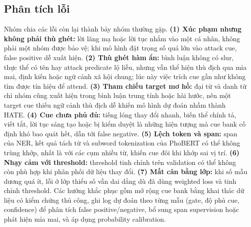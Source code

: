 \documentclass[11pt]{article}
\begin{document}
\subsection{Phân tích lỗi}
Nhóm chia các lỗi còn lại thành bảy nhóm thường gặp. \textbf{(1) Xúc phạm nhưng không phải thù ghét:} lời lăng mạ hoặc lời tục nhắm vào một cá nhân, không phải một nhóm được bảo vệ; khi mô hình đặt trọng số quá lớn vào attack cue, false positive dễ xuất hiện. \textbf{(2) Thù ghét hàm ẩn:} bình luận không có slur, thực thể có tên hay attack predicate lộ liễu, nhưng vẫn thể hiện thù địch qua mỉa mai, định kiến hoặc ngữ cảnh xã hội chung; lúc này việc trích cue gần như không tìm được tín hiệu để attend. \textbf{(3) Tham chiếu target mơ hồ:} đại từ và danh từ chỉ nhóm cũng xuất hiện trong bình luận trung tính hoặc hài hước, nên một target cue thiếu ngữ cảnh thù địch dễ khiến mô hình dự đoán nhầm thành HATE. \textbf{(4) Cue chưa phủ đủ:} tiếng lóng thay đổi nhanh, biến thể chính tả, viết tắt, lời tục sáng tạo hoặc bị kiểm duyệt là những hiện tượng mà cue bank cố định khó bao quát hết, dẫn tới false negative. \textbf{(5) Lệch token và span:} span của NER, kết quả tách từ và subword tokenization của PhoBERT có thể không trùng khớp, nhất là với các cụm nhiều từ, khiến cue đôi khi khớp sai vị trí. \textbf{(6) Nhạy cảm với threshold:} threshold tinh chỉnh trên validation có thể không còn phù hợp khi phân phối dữ liệu thay đổi. \textbf{(7) Mất cân bằng lớp:} khi số mẫu dương quá ít, lỗi ở lớp thiểu số vẫn dai dẳng dù đã dùng weighted loss và tinh chỉnh threshold. Các hướng khắc phục gồm mở rộng cue bank bằng khai thác dữ liệu có kiểm chứng thủ công, ghi log dự đoán theo từng mẫu (gate, độ phủ cue, confidence) để phân tích false positive/negative, bổ sung span supervision hoặc phát hiện mỉa mai, và áp dụng probability calibration.
\end{document}
